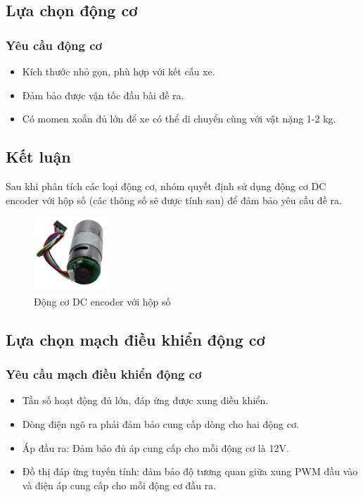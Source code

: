         \subsection{Lựa chọn động cơ}
            \subsubsection{Yêu cầu động cơ}
                \begin{itemize}
                    \item Kích thước nhỏ gọn, phù hợp với kết cấu xe.
                    \item Đảm bảo được vận tốc đầu bài đề ra.
                    \item Có momen xoắn đủ lớn để xe có thể di chuyển cùng với vật nặng 1-2 kg.
                \end{itemize}
            \subsection{Kết luận}
                \hspace*{0.6cm}Sau khi phân tích các loại động cơ, nhóm quyết định sử dụng động cơ DC encoder với hộp số (các thông số sẽ được tính sau) để đảm bảo yêu cầu đề ra.
                \begin{figure}[H]
                    \centering
                    \includegraphics[width=0.25\textwidth]{pictures/chapter2/chapter2_pic_11.png}
                    \caption{Động cơ DC encoder với hộp số}
                    \label{fig:dc_motor_with_encoder}
                \end{figure} 
        \subsection{Lựa chọn mạch điều khiển động cơ}
            \subsubsection{Yêu cầu mạch điều khiển động cơ}
                \begin{itemize}
                    \item Tần số hoạt động đủ lớn, đáp ứng được xung điều khiển.
                    \item Dòng điện ngõ ra phải đảm bảo cung cấp dòng cho hai động cơ.
                    \item Áp đầu ra: Đảm bảo đủ áp cung cấp cho mỗi động cơ là 12V. 
                    \item Đồ thị đáp ứng tuyến tính: đảm bảo độ tương quan giữa xung PWM đầu vào và điện áp cung cấp cho mỗi động cơ đầu ra. 
                \end{itemize}
